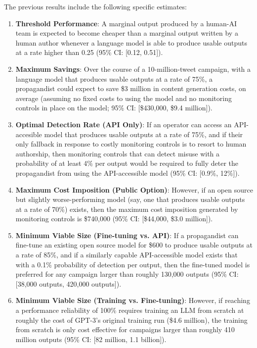 \documentclass{article}
\begin{document}
The previous results include the following specific estimates: 

\begin{enumerate}
  \item \textbf{Threshold Performance}: A marginal output produced by a human-AI team is expected to become cheaper than a marginal output written by a human author whenever a language model is able to produce usable outputs at a rate higher than 0.25 (95\% CI: [0.12, 0.51]).
  \item \textbf{Maximum Savings}: Over the course of a 10-million-tweet campaign, with a language model that produces usable outputs at a rate of 75\%, a propagandist could expect to save \$3 million in content generation costs, on average (assuming no fixed costs to using the model and no monitoring controls in place on the model; 95\% CI: [\$430,000, \$9.4 million]).
  \item \textbf{Optimal Detection Rate (API Only)}: If an operator can access an API-accesible model that produces usable outputs at a rate of 75\%, and if their only fallback in response to costly monitoring controls is to resort to human authorship, then monitoring controls that can detect misuse with a probability of at least 4\% per output would be required to fully deter the propagandist from using the API-accessible model (95\% CI: [0.9\%, 12\%]).
  \item \textbf{Maximum Cost Imposition (Public Option)}: However, if an open source but slightly worse-performing model (say, one that produces usable outputs at a rate of 70\%) exists, then the maximum cost imposition generated by monitoring controls is \$740,000 (95\% CI: [\$44,000, \$3.0 million]).
  \item \textbf{Minimum Viable Size (Fine-tuning vs. API)}: If a propagandist can fine-tune an existing open source model for \$600 to produce usable outputs at a rate of 85\%, and if a similarly capable API-accessible model exists that with a 0.1\% probability of detection per output, then the fine-tuned model is preferred for any campaign larger than roughly 130,000 outputs (95\% CI: [38,000 outputs, 420,000 outputs]).
  \item \textbf{Minimum Viable Size (Training vs. Fine-tuning)}: However, if reaching a performance reliability of 100\% requires training an LLM from scratch at roughly the cost of GPT-3's original training run (\$4.6 million), the training from scratch is only cost effective for campaigns larger than roughly 410 million outputs (95\% CI: [82 million, 1.1 billion]).
\end{enumerate}
\end{document}
